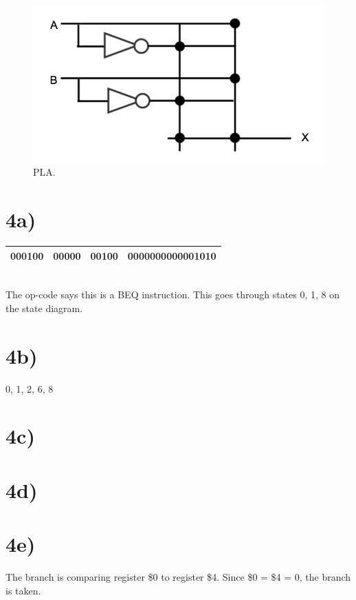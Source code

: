 \documentclass[a4paper,11pt]{article}
\begin{document}
\begin{figure}[h]
\caption{PLA.}
\centering
\includegraphics[width=.8\textwidth]{problem_3_pla.png}
\end{figure}



\section*{4a)}
\begin{tabular}{| c | c | c | c |}
  \hline	
   000100 & 00000 & 00100 & 0000000000001010 \\  \hline
\end{tabular} \\

The op-code says this is a BEQ instruction.  This goes through states 0, 1, 8 on the state diagram.

\section*{4b)}
0, 1, 2, 6, 8

\section*{4c)}


\section*{4d)}


\section*{4e)}
The branch is comparing register \$0 to register \$4.  Since \$0 = \$4 = 0, the branch is taken.  


\end{document}
